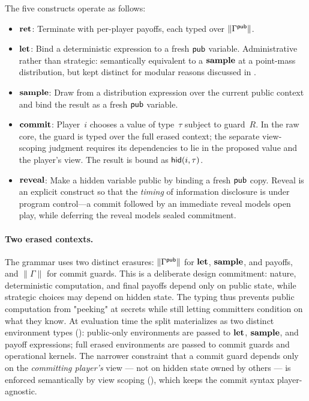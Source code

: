 \documentclass[11pt]{article}
\begin{document}
\noindent
The five constructs operate as follows:
\begin{itemize}[nosep]
\item $\mathbf{ret}$: Terminate with per-player payoffs, each typed over
      $\|\Gamma^{\mathsf{pub}}\|$.
\item $\mathbf{let}$: Bind a deterministic expression to a fresh $\mathsf{pub}$ variable.
      Administrative rather than strategic: semantically
      equivalent to a $\mathbf{sample}$ at a point-mass distribution, but kept
      distinct for modular reasons discussed in .
\item $\mathbf{sample}$: Draw from a distribution expression over the current public
      context and bind the result as a fresh $\mathsf{pub}$ variable.
\item $\mathbf{commit}$: Player~$i$ chooses a value of type~$\tau$ subject
      to guard~$R$. In the raw core, the guard is typed over the full erased
      context; the separate view-scoping judgment requires its dependencies to
      lie in the proposed value and the player's view. The result is bound as
      $\mathsf{hid}(i, \tau)$.
\item $\mathbf{reveal}$: Make a hidden variable public by binding a fresh $\mathsf{pub}$ copy.
      Reveal is an explicit construct so that the \emph{timing} of information
      disclosure is under program control---a commit followed by an immediate
      reveal models open play, while deferring the reveal models sealed
      commitment.
\end{itemize}

\paragraph{Two erased contexts.}
The grammar uses two distinct erasures: $\|\Gamma^{\mathsf{pub}}\|$ for $\mathbf{let}$,
$\mathbf{sample}$, and payoffs, and $\|\Gamma\|$ for commit guards. This is a
deliberate design commitment: nature, deterministic computation, and final
payoffs depend only on public state, while strategic choices may depend on
hidden state. The typing thus prevents public computation from "peeking" at
secrets while still letting committers condition on what they know. At
evaluation time the split materializes as two distinct environment types
(): public-only environments are passed to $\mathbf{let}$,
$\mathbf{sample}$, and payoff expressions; full erased environments are passed to
commit guards and operational kernels. The narrower constraint that a commit
guard depends only on the \emph{committing player's} view --- not on hidden
state owned by others --- is enforced semantically by view scoping
(), which keeps the commit syntax player-agnostic.
\end{document}
